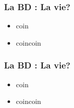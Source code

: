 \speaker{\Michel}
\begin{frame}
  \frametitle{La BD : La vie?}
  \begin{itemize}
    \item coin
    \item coincoin
  \end{itemize}
\end{frame}

\speaker{\Julie}
\begin{frame}
  \frametitle{La BD : La vie?}
  \begin{itemize}
    \item coin
    \item coincoin
  \end{itemize}
\end{frame}
